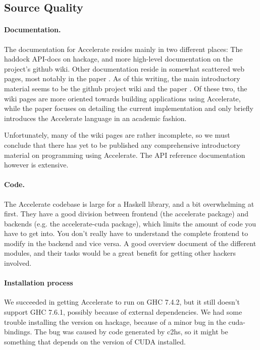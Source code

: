 \subsection{Source Quality}

\paragraph{Documentation.} The documentation for Accelerate resides mainly in
two different places: The haddock API-docs on hackage, and more high-level
documentation on the project's github wiki.  Other documentation reside in
somewhat scattered web pages, most notably in the paper
\cite{chakravarty2011accelerating}.  As of this writing, the main introductory
material seems to be the github project wiki and the paper
\cite{chakravarty2011accelerating}. Of these two, the wiki pages are more
oriented towards building applications using Accelerate, while the paper
focuses on detailing the current implementation and only briefly introduces the
Accelerate language in an academic fashion.

Unfortunately, many of the wiki pages are rather incomplete, so we must
conclude that there has yet to be published any comprehensive introductory
material on programming using Accelerate.
The API reference documentation however is extensive.

\paragraph{Code.} The Accelerate codebase is large for a Haskell library, and
a bit overwhelming at first. They have a good division between frontend (the
accelerate package) and backends (e.g. the accelerate-cuda package), which
limits the amount of code you have to get into. You don't really have to
understand the complete frontend to modify in the backend and vice versa. A
good overview document of the different modules, and their tasks would be a
great benefit for getting other hackers involved.

\paragraph{Installation process} We succeeded in getting Accelerate to run on
GHC 7.4.2, but it still doesn't support GHC 7.6.1, possibly because of external
dependencies.  We had some trouble installing the version on hackage, because
of a minor bug in the cuda-bindings. The bug was caused by code generated by
c2hs, so it might be something that depends on the version of CUDA installed.

